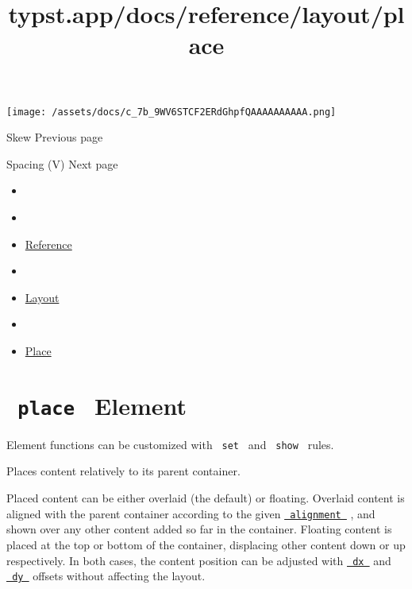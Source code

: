 \texttt{[image: /assets/docs/c\_7b\_9WV6STCF2ERdGhpfQAAAAAAAAAA.png]}

\href{/docs/reference/layout/skew/}{\pandocbounded{}}

{ Skew } { Previous page }

\href{/docs/reference/layout/v/}{\pandocbounded{}}

{ Spacing (V) } { Next page }


\title{typst.app/docs/reference/layout/place}

\begin{itemize}
\tightlist
\item
  \href{/docs}{}
\item
  
\item
  \href{/docs/reference/}{Reference}
\item
  
\item
  \href{/docs/reference/layout/}{Layout}
\item
  
\item
  \href{/docs/reference/layout/place/}{Place}
\end{itemize}

\section{\texorpdfstring{\texttt{\ place\ } {{ Element
}}}{ place   Element }}\label{summary}

\label{element-tooltip}
Element functions can be customized with \texttt{\ set\ } and
\texttt{\ show\ } rules.

Places content relatively to its parent container.

Placed content can be either overlaid (the default) or floating.
Overlaid content is aligned with the parent container according to the
given
\href{/docs/reference/layout/place/\#parameters-alignment}{\texttt{\ alignment\ }}
, and shown over any other content added so far in the container.
Floating content is placed at the top or bottom of the container,
displacing other content down or up respectively. In both cases, the
content position can be adjusted with
\href{/docs/reference/layout/place/\#parameters-dx}{\texttt{\ dx\ }} and
\href{/docs/reference/layout/place/\#parameters-dy}{\texttt{\ dy\ }}
offsets without affecting the layout.

